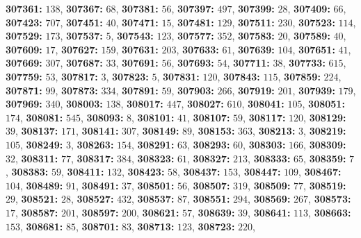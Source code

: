 \textsf{\bfseries 307361:} $138$, \textsf{\bfseries 307367:} $68$, \textsf{\bfseries 307381:} $56$, \textsf{\bfseries 307397:} $497$, \textsf{\bfseries 307399:} $28$, \textsf{\bfseries 307409:} $66$, \textsf{\bfseries 307423:} $707$, \textsf{\bfseries 307451:} $40$, \textsf{\bfseries 307471:} $15$, \textsf{\bfseries 307481:} $129$, \textsf{\bfseries 307511:} $230$, \textsf{\bfseries 307523:} $114$, \textsf{\bfseries 307529:} $173$, \textsf{\bfseries 307537:} $5$, \textsf{\bfseries 307543:} $123$, \textsf{\bfseries 307577:} $352$, \textsf{\bfseries 307583:} $20$, \textsf{\bfseries 307589:} $40$, \textsf{\bfseries 307609:} $17$, \textsf{\bfseries 307627:} $159$, \textsf{\bfseries 307631:} $203$, \textsf{\bfseries 307633:} $61$, \textsf{\bfseries 307639:} $104$, \textsf{\bfseries 307651:} $41$, \textsf{\bfseries 307669:} $307$, \textsf{\bfseries 307687:} $33$, \textsf{\bfseries 307691:} $56$, \textsf{\bfseries 307693:} $54$, \textsf{\bfseries 307711:} $38$, \textsf{\bfseries 307733:} $615$, \textsf{\bfseries 307759:} $53$, \textsf{\bfseries 307817:} $3$, \textsf{\bfseries 307823:} $5$, \textsf{\bfseries 307831:} $120$, \textsf{\bfseries 307843:} $115$, \textsf{\bfseries 307859:} $224$, \textsf{\bfseries 307871:} $99$, \textsf{\bfseries 307873:} $334$, \textsf{\bfseries 307891:} $59$, \textsf{\bfseries 307903:} $266$, \textsf{\bfseries 307919:} $201$, \textsf{\bfseries 307939:} $179$, \textsf{\bfseries 307969:} $340$, \textsf{\bfseries 308003:} $138$, \textsf{\bfseries 308017:} $447$, \textsf{\bfseries 308027:} $610$, \textsf{\bfseries 308041:} $105$, \textsf{\bfseries 308051:} $174$, \textsf{\bfseries 308081:} $545$, \textsf{\bfseries 308093:} $8$, \textsf{\bfseries 308101:} $41$, \textsf{\bfseries 308107:} $59$, \textsf{\bfseries 308117:} $120$, \textsf{\bfseries 308129:} $39$, \textsf{\bfseries 308137:} $171$, \textsf{\bfseries 308141:} $307$, \textsf{\bfseries 308149:} $89$, \textsf{\bfseries 308153:} $363$, \textsf{\bfseries 308213:} $3$, \textsf{\bfseries 308219:} $105$, \textsf{\bfseries 308249:} $3$, \textsf{\bfseries 308263:} $154$, \textsf{\bfseries 308291:} $63$, \textsf{\bfseries 308293:} $60$, \textsf{\bfseries 308303:} $166$, \textsf{\bfseries 308309:} $32$, \textsf{\bfseries 308311:} $77$, \textsf{\bfseries 308317:} $384$, \textsf{\bfseries 308323:} $61$, \textsf{\bfseries 308327:} $213$, \textsf{\bfseries 308333:} $65$, \textsf{\bfseries 308359:} $7$, \textsf{\bfseries 308383:} $59$, \textsf{\bfseries 308411:} $132$, \textsf{\bfseries 308423:} $58$, \textsf{\bfseries 308437:} $153$, \textsf{\bfseries 308447:} $109$, \textsf{\bfseries 308467:} $104$, \textsf{\bfseries 308489:} $91$, \textsf{\bfseries 308491:} $37$, \textsf{\bfseries 308501:} $56$, \textsf{\bfseries 308507:} $319$, \textsf{\bfseries 308509:} $77$, \textsf{\bfseries 308519:} $29$, \textsf{\bfseries 308521:} $28$, \textsf{\bfseries 308527:} $432$, \textsf{\bfseries 308537:} $87$, \textsf{\bfseries 308551:} $294$, \textsf{\bfseries 308569:} $267$, \textsf{\bfseries 308573:} $17$, \textsf{\bfseries 308587:} $201$, \textsf{\bfseries 308597:} $200$, \textsf{\bfseries 308621:} $57$, \textsf{\bfseries 308639:} $39$, \textsf{\bfseries 308641:} $113$, \textsf{\bfseries 308663:} $153$, \textsf{\bfseries 308681:} $85$, \textsf{\bfseries 308701:} $83$, \textsf{\bfseries 308713:} $123$, \textsf{\bfseries 308723:} $220$, 
